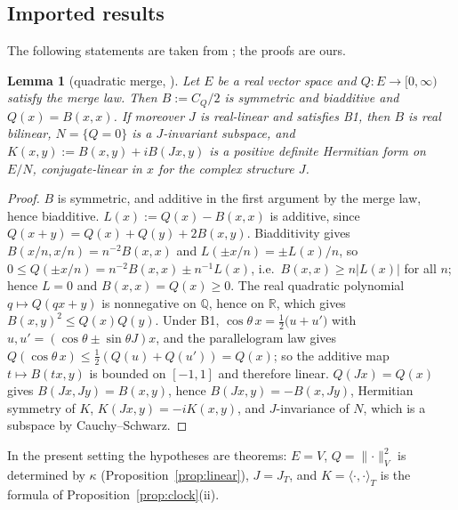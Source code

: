 \documentclass[aps,pra,onecolumn,superscriptaddress,nofootinbib,10pt]{revtex4-2}
\newtheorem{lemma}[theorem]{Lemma}
\theoremstyle{definition}
\theoremstyle{remark}
\newcommand{\R}{\mathbb{R}}
\newcommand{\ip}[2]{\langle #1,#2\rangle}
\begin{document}
\subsection{Imported results}
The following statements are taken from \cite{CRQO}; the proofs are ours.

\begin{lemma}[quadratic merge, {\cite[\S4]{CRQO}}]\label{lem:B0}
Let $E$ be a real vector space and $Q\colon E\to[0,\infty)$ satisfy the merge law.  Then $B:=C_Q/2$ is
symmetric and biadditive and $Q(x)=B(x,x)$.  If moreover $J$ is real-linear and satisfies B1, then $B$ is
real bilinear,
$N=\{Q=0\}$ is a $J$-invariant subspace, and $K(x,y):=B(x,y)+iB(Jx,y)$ is a positive definite Hermitian
form on $E/N$, conjugate-linear in $x$ for the complex structure $J$.
\end{lemma}
\begin{proof}
$B$ is symmetric, and additive in the first argument by the merge law, hence biadditive.
$L(x):=Q(x)-B(x,x)$ is additive, since $Q(x+y)=Q(x)+Q(y)+2B(x,y)$.  Biadditivity gives
$B(x/n,x/n)=n^{-2}B(x,x)$ and $L(\pm x/n)=\pm L(x)/n$, so $0\le Q(\pm x/n)=n^{-2}B(x,x)\pm n^{-1}L(x)$,
i.e.\ $B(x,x)\ge n\lvert L(x)\rvert$ for all $n$; hence $L=0$ and $B(x,x)=Q(x)\ge0$.  The real
quadratic polynomial $q\mapsto Q(qx+y)$ is nonnegative on $\mathbb Q$, hence on $\R$, which gives
$B(x,y)^2\le Q(x)Q(y)$.  Under B1, $\cos\theta\,x=\tfrac12\bigl(u+u'\bigr)$ with
$u,u'=(\cos\theta\pm\sin\theta J)x$, and the parallelogram law gives $Q(\cos\theta\,x)\le\tfrac12(Q(u)+Q(u'))=Q(x)$;
so the additive map $t\mapsto B(tx,y)$ is bounded on $[-1,1]$ and therefore linear.  $Q(Jx)=Q(x)$ gives
$B(Jx,Jy)=B(x,y)$, hence $B(Jx,y)=-B(x,Jy)$, Hermitian symmetry of $K$, $K(Jx,y)=-iK(x,y)$, and
$J$-invariance of $N$, which is a subspace by Cauchy--Schwarz.
\end{proof}
In the present setting the hypotheses are theorems: $E=V$, $Q=\lVert\cdot\rVert_V^2$ is determined by
$\kappa$ (Proposition~\ref{prop:linear}), $J=J_T$, and $K=\ip{\cdot}{\cdot}_T$ is the formula of
Proposition~\ref{prop:clock}(ii).
\end{document}
